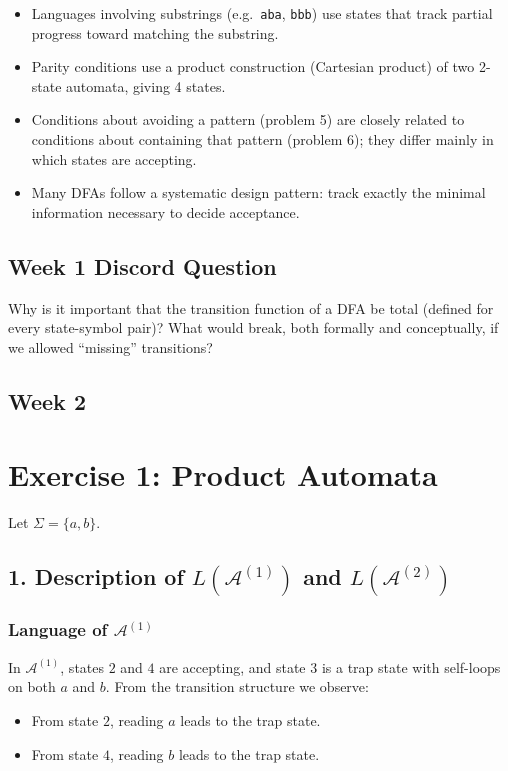 \documentclass{article}
\theoremstyle{theorem}
\theoremstyle{definition}
\theoremstyle{remark}
\begin{document}
\begin{itemize}
\item Languages involving substrings (e.g.\ \texttt{aba}, \texttt{bbb})
      use states that track partial progress toward matching the substring.
\item Parity conditions use a product construction (Cartesian product)
      of two 2-state automata, giving 4 states.
\item Conditions about avoiding a pattern (problem 5) are closely related
      to conditions about containing that pattern (problem 6);
      they differ mainly in which states are accepting.
\item Many DFAs follow a systematic design pattern:
      track exactly the minimal information necessary to decide acceptance.
\end{itemize}

\subsection*{Week 1 Discord Question}
Why is it important that the transition function of a DFA be total (defined for every state-symbol pair)? What would break, both formally and conceptually, if we allowed “missing” transitions?

\subsection{Week 2}

\section*{Exercise 1: Product Automata}

Let $\Sigma = \{a,b\}$.

\subsection*{1. Description of $L(\mathcal A^{(1)})$ and $L(\mathcal A^{(2)})$}

\subsubsection*{Language of $\mathcal A^{(1)}$}

In $\mathcal A^{(1)}$, states $2$ and $4$ are accepting, and state $3$ is a trap state with self-loops on both $a$ and $b$. 
From the transition structure we observe:

\begin{itemize}
    \item From state $2$, reading $a$ leads to the trap state.
    \item From state $4$, reading $b$ leads to the trap state.
\end{itemize}
\end{document}
